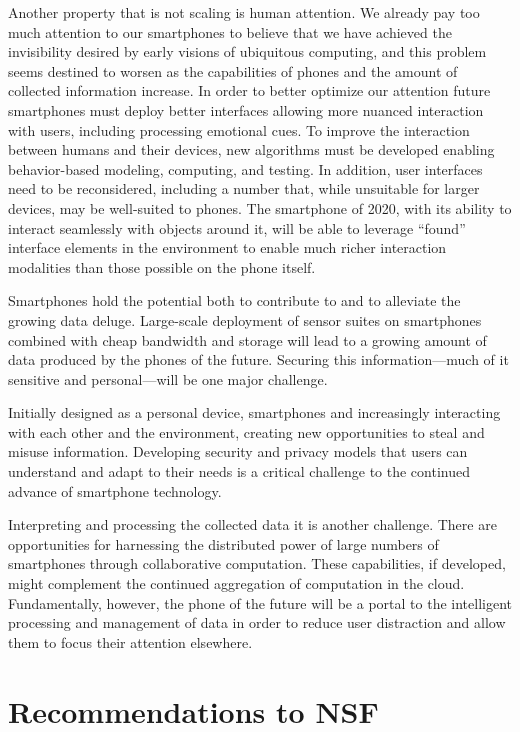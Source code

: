 Another property that is not scaling is human attention. We already pay too
much attention to our smartphones to believe that we have achieved the
invisibility desired by early visions of ubiquitous computing, and this
problem seems destined to worsen as the capabilities of phones and the amount
of collected information increase. In order to better optimize our attention
future smartphones must deploy better interfaces allowing more nuanced
interaction with users, including processing emotional cues. To improve the
interaction between humans and their devices, new algorithms must be
developed enabling behavior-based modeling, computing, and testing. In
addition, user interfaces need to be reconsidered, including a number that,
while unsuitable for larger devices, may be well-suited to phones. The
smartphone of 2020, with its ability to interact seamlessly with objects
around it, will be able to leverage “found” interface elements in the
environment to enable much richer interaction modalities than those possible
on the phone itself.
 
Smartphones hold the potential both to contribute to and to alleviate the
growing data deluge. Large-scale deployment of sensor suites on smartphones
combined with cheap bandwidth and storage will lead to a growing amount of
data produced by the phones of the future. Securing this information---much
of it sensitive and personal---will be one major challenge. 
 
Initially designed as a personal device, smartphones and increasingly
interacting with each other and the environment, creating new opportunities
to steal and misuse information. Developing security and privacy models that
users can understand and adapt to their needs is a critical challenge to the
continued advance of smartphone technology.
 
Interpreting and processing the collected data it is another challenge. There
are opportunities for harnessing the distributed power of large numbers of
smartphones through collaborative computation. These capabilities, if
developed, might complement the continued aggregation of computation in the
cloud. Fundamentally, however, the phone of the future will be a portal to
the intelligent processing and management of data in order to reduce user
distraction and allow them to focus their attention elsewhere.

\section{Recommendations to NSF}

